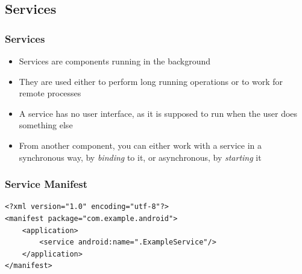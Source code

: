 \subsection{Services}

\begin{frame}
  \frametitle{Services}
  \begin{itemize}
  \item Services are components running in the background
  \item They are used either to perform long running operations or
    to work for remote processes
  \item A service has no user interface, as it is supposed to run when the
    user does something else
  \item From another component, you can either work with a service in
    a synchronous way, by \emph{binding} to it, or asynchronous, by
    \emph{starting} it
  \end{itemize}
\end{frame}

\begin{frame}[fragile]
  \frametitle{Service Manifest}
\begin{verbatim}
<?xml version="1.0" encoding="utf-8"?>
<manifest package="com.example.android">
    <application>
        <service android:name=".ExampleService"/>
    </application>
</manifest>
\end{verbatim}
\end{frame}

